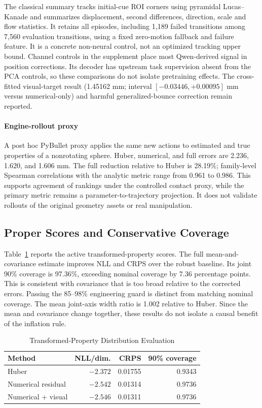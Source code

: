 \documentclass{ieeeaccess}
\begin{document}
The classical summary tracks initial-cue ROI corners using pyramidal Lucas--Kanade and summarizes displacement, second differences, direction, scale and flow statistics. It retains all episodes, including 1,189 failed transitions among 7,560 evaluation transitions, using a fixed zero-motion fallback and failure feature. It is a concrete non-neural control, not an optimized tracking upper bound. Channel controls in the supplement place most Qwen-derived signal in position corrections. Its decoder has upstream task supervision absent from the PCA controls, so these comparisons do not isolate pretraining effects. The cross-fitted visual-target result (1.45162 mm; interval $[-0.03446,+0.00095]$ mm versus numerical-only) and harmful generalized-bounce correction remain reported.

\paragraph{Engine-rollout proxy}
A post hoc PyBullet proxy applies the same new actions to estimated and true properties of a nonrotating sphere. Huber, numerical, and full errors are 2.236, 1.620, and 1.606 mm. The full reduction relative to Huber is 28.19\%; family-level Spearman correlations with the analytic metric range from 0.961 to 0.986. This supports agreement of rankings under the controlled contact proxy, while the primary metric remains a parameter-to-trajectory projection. It does not validate rollouts of the original geometry assets or real manipulation.

\subsection{Proper Scores and Conservative Coverage}
Table~\ref{tab:uncertainty} reports the active transformed-property scores. The full mean-and-covariance estimate improves NLL and CRPS over the robust baseline. Its joint 90\% coverage is 97.36\%, exceeding nominal coverage by 7.36 percentage points. This is consistent with covariance that is too broad relative to the corrected errors. Passing the 85--98\% engineering guard is distinct from matching nominal coverage. The mean joint-axis width ratio is 1.002 relative to Huber. Since the mean and covariance change together, these results do not isolate a causal benefit of the inflation rule.

\begin{table}[t]\caption{Transformed-Property Distribution Evaluation}\label{tab:uncertainty}\centering
\begin{tabular}{lrrr}\toprule Method & NLL/dim. & CRPS & 90\% coverage\\\midrule
Huber & $-2.372$ & 0.01755 & 0.9343\\
Numerical residual & $-2.542$ & 0.01314 & 0.9736\\
Numerical + visual & $-2.546$ & 0.01311 & 0.9736\\\bottomrule
\end{tabular}\end{table}
\end{document}
